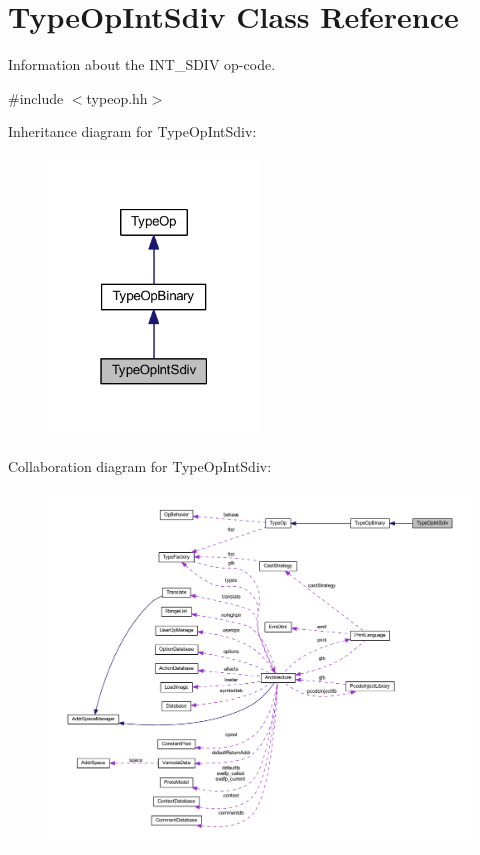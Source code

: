 \hypertarget{class_type_op_int_sdiv}{}\section{Type\+Op\+Int\+Sdiv Class Reference}
\label{class_type_op_int_sdiv}


Information about the I\+N\+T\+\_\+\+S\+D\+IV op-\/code.  




{\ttfamily \#include $<$typeop.\+hh$>$}



Inheritance diagram for Type\+Op\+Int\+Sdiv\+:
\nopagebreak
\begin{figure}[H]
\begin{center}
\leavevmode
\includegraphics[width=159pt]{class_type_op_int_sdiv__inherit__graph}
\end{center}
\end{figure}


Collaboration diagram for Type\+Op\+Int\+Sdiv\+:
\nopagebreak
\begin{figure}[H]
\begin{center}
\leavevmode
\includegraphics[width=350pt]{class_type_op_int_sdiv__coll__graph}
\end{center}
\end{figure}
